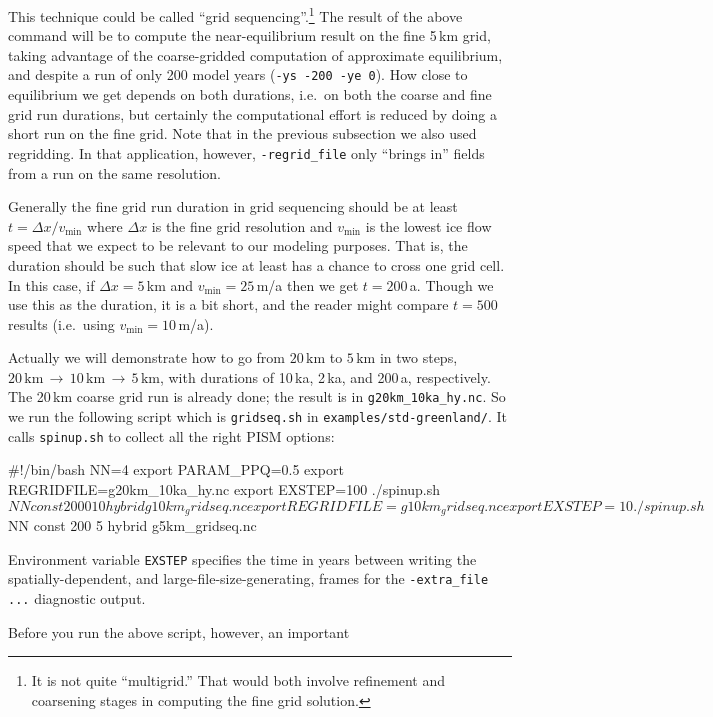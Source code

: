 This technique could be called ``grid sequencing''.\footnote{It is not quite ``multigrid.''  That would both involve refinement and coarsening stages in computing the fine grid solution.}  The result of the above command will be to compute the near-equilibrium result on the fine 5\,km grid, taking advantage of the coarse-gridded computation of approximate equilibrium, and despite a run of only 200 model years (\verb|-ys -200 -ye 0|).  How close to equilibrium we get depends on both durations, i.e.~on both the coarse and fine grid run durations, but certainly the computational effort is reduced by doing a short run on the fine grid.  Note that in the previous subsection we also used regridding.  In that application, however, \verb|-regrid_file| only ``brings in'' fields from a run on the same resolution.

Generally the fine grid run duration in grid sequencing should be at least $t = \Delta x / v_{\text{min}}$ where $\Delta x$ is the fine grid resolution and $v_{\text{min}}$ is the lowest ice flow speed that we expect to be relevant to our modeling purposes.  That is, the duration should be such that slow ice at least has a chance to cross one grid cell.  In this case, if $\Delta x = 5$\,km and $v_{\text{min}} = 25$\,m/a then we get $t=200$\,a.  Though we use this as the duration, it is a bit short, and the reader might compare $t=500$ results (i.e.~using $v_{\text{min}} = 10$\,m/a).

Actually we will demonstrate how to go from $20\,\text{km}$ to $5\,\text{km}$ in two steps, $20\,\text{km}\,\to\,10\,\text{km}\,\to\,5\,\text{km}$, with durations of 10\,ka, 2\,ka, and 200\,a, respectively.  The 20\,km coarse grid run is already done; the result is in \texttt{g20km_10ka_hy.nc}.  So we run the following script which is \texttt{gridseq.sh} in \texttt{examples/std-greenland/}.  It calls \texttt{spinup.sh} to collect all the right PISM options:
\begin{scriptvrb}
#!/bin/bash
NN=4
export PARAM_PPQ=0.5
export REGRIDFILE=g20km_10ka_hy.nc
export EXSTEP=100
./spinup.sh $NN const 2000  10 hybrid g10km_gridseq.nc
export REGRIDFILE=g10km_gridseq.nc
export EXSTEP=10
./spinup.sh $NN const 200    5 hybrid  g5km_gridseq.nc
\end{scriptvrb}
Environment variable \verb|EXSTEP| specifies the time in years between writing the spatially-dependent, and large-file-size-generating, frames for the \verb|-extra_file ...| diagnostic output.

Before you run the above script, however, an important

